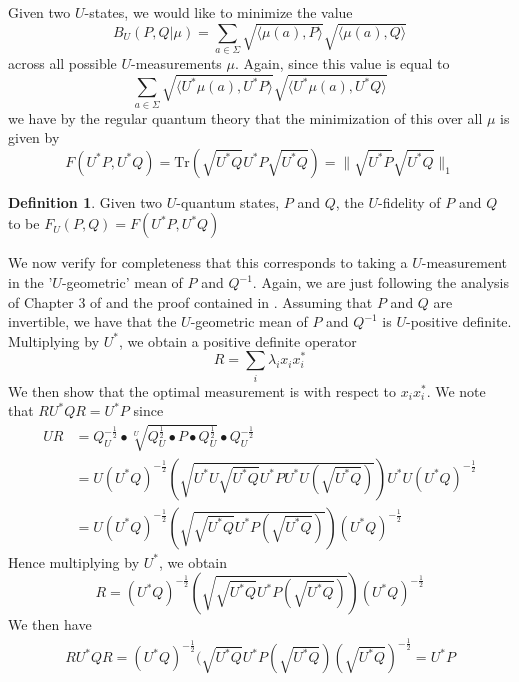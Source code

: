 \documentclass{amsart}
\numberwithin{equation}{section}
\theoremstyle{definition}
\newtheorem{definition}[theorem]{Definition}
\theoremstyle{plain}
\theoremstyle{solutionstyle}
\begin{document}
Given two $U$-states, we would like to minimize the value 
\begin{equation*}B_U(P,Q|\mu)=\sum_{a\in\Sigma}\sqrt{\langle \mu(a),P\rangle}\sqrt{\langle \mu(a),Q\rangle}\end{equation*} across all possible $U$-measurements $\mu$. Again, since this value is equal to \begin{equation*}\sum_{a\in\Sigma}\sqrt{\langle U^*\mu(a),U^*P\rangle}\sqrt{\langle U^*\mu(a),U^*Q\rangle}\end{equation*} we have by the regular quantum theory 
that the minimization of this over all $\mu$ is given by 
\begin{equation*}F(U^*P,U^*Q)=\mathrm{Tr}(\sqrt{U^*Q}U^*P\sqrt{U^*Q})=\|\sqrt{U^*P}\sqrt{U^*Q}\|_1\end{equation*}
\begin{definition}
    Given two $U$-quantum states, $P$ and $Q$, the $U$-fidelity of $P$ and $Q$ to be 
    $F_U(P,Q)=F(U^*P,U^*Q)$
\end{definition}
We now verify for completeness that this corresponds to taking a $U$-measurement in the '$U$-geometric' mean of $P$ and $Q^{-1}$. Again, we are just following the analysis of Chapter 3 of \cite{Watrous_2018} and the proof contained in \cite{wilde2015lecture16}. Assuming that $P$ and $Q$ are invertible, we have that the $U$-geometric mean of $P$ and $Q^{-1}$ is $U$-positive definite. Multiplying by $U^*$, we obtain a positive definite operator
    \begin{equation*}
        R=\sum_{i}\lambda_ix_ix_i^*
    \end{equation*}
    We then show that the optimal measurement is with respect to $x_ix_i^*$. We note that $RU^*QR=U^*P$
     since 
     \begin{align*}
         UR&=Q_U^{-\frac{1}{2}}\bullet\sqrt[U]{Q_U^{\frac{1}{2}}\bullet P\bullet Q_U^{\frac{1}{2}}}\bullet Q_U^{-\frac{1}{2}}\\
         &= U(U^*Q)^{-\frac{1}{2}}(\sqrt{U^*U\sqrt{U^*Q}U^*PU^*U(\sqrt{U^*Q})})U^*U(U^*Q)^{-\frac{1}{2}}\\
         &=U(U^*Q)^{-\frac{1}{2}}(\sqrt{\sqrt{U^*Q}U^*P(\sqrt{U^*Q})})(U^*Q)^{-\frac{1}{2}}
     \end{align*}
     Hence multiplying by $U^*$, we obtain 
     \begin{equation*}R=(U^*Q)^{-\frac{1}{2}}(\sqrt{\sqrt{U^*Q}U^*P(\sqrt{U^*Q})})(U^*Q)^{-\frac{1}{2}}\end{equation*}
     We then have 
     \begin{align*}
         RU^*QR=(U^*Q)^{-\frac{1}{2}}(\sqrt{U^*Q}U^*P(\sqrt{U^*Q})(\sqrt{U^*Q})^{-\frac{1}{2}}=U^*P   
     \end{align*}
\end{document}
